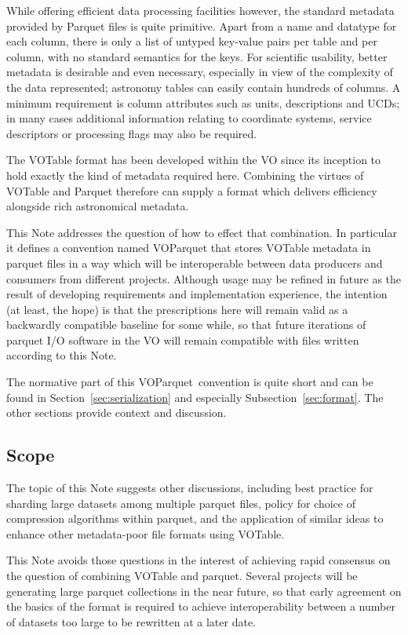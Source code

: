 \documentclass[11pt,a4paper]{ivoa}
\newcommand{\voparquet}{VOParquet}
\begin{document}
While offering efficient data processing facilities however,
the standard metadata provided by Parquet files is quite primitive.
Apart from a name and datatype for each column,
there is only a list of untyped key-value pairs per table
and per column, with no standard semantics for the keys.
For scientific usability, better metadata is desirable and even necessary,
especially in view of the complexity of the data represented;
astronomy tables can easily contain hundreds of columns.
A minimum requirement is column attributes such as units, descriptions
and UCDs; in many cases additional information relating to
coordinate systems, service descriptors or processing flags
may also be required.

The VOTable format \citep{2019ivoa.spec.1021O}
has been developed within the VO since its
inception to hold exactly the kind of metadata required here.
Combining the virtues of VOTable and Parquet therefore
can supply a format which delivers efficiency alongside
rich astronomical metadata.

This Note addresses the question of how to effect that combination.
In particular it defines a convention named {\voparquet}
that stores VOTable metadata in parquet files in a way
which will be interoperable
between data producers and consumers from different projects.
Although usage may be refined in future as the result of
developing requirements and implementation experience,
the intention (at least, the hope) is that the
prescriptions here will remain valid as a backwardly compatible
baseline for some while, so that future iterations of parquet I/O
software in the VO will remain compatible with files written
according to this Note.

The normative part of this \voparquet\ convention
is quite short and can be found in Section~\ref{sec:serialization}
and especially Subsection~\ref{sec:format}.
The other sections provide context and discussion.

\subsection{Scope}
\label{sec:scope}

The topic of this Note suggests other discussions, including
best practice for sharding large datasets among multiple parquet files,
policy for choice of compression algorithms within parquet,
and the application of similar ideas to enhance other metadata-poor
file formats using VOTable.

This Note avoids those questions in the interest of achieving rapid
consensus on the question of combining VOTable and parquet.
Several projects will be generating large parquet collections
in the near future, so that early agreement on the basics of the format
is required to achieve interoperability between a number of
datasets too large to be rewritten at a later date.
\end{document}
